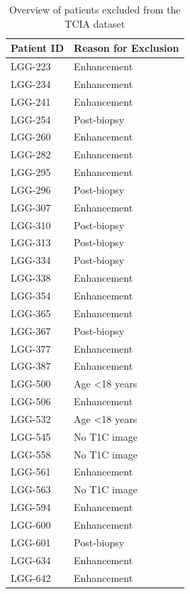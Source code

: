 \begin{subappendices}
\begin{table}[h]
    \centering
    \begin{tabular}{ll}
        \toprule
        \textbf{Patient ID} & \textbf{Reason for Exclusion} \\
        \midrule
        LGG-223 & Enhancement \\
        LGG-234 & Enhancement \\
        LGG-241 & Enhancement \\
        LGG-254 & Post-biopsy \\
        LGG-260 & Enhancement \\
        LGG-282 & Enhancement \\
        LGG-295 & Enhancement \\
        LGG-296 & Post-biopsy \\
        LGG-307 & Enhancement \\
        LGG-310 & Post-biopsy \\
        LGG-313 & Post-biopsy \\
        LGG-334 & Post-biopsy \\
        LGG-338 & Enhancement \\
        LGG-354 & Enhancement \\
        LGG-365 & Enhancement \\
        LGG-367 & Post-biopsy \\
        LGG-377 & Enhancement \\
        LGG-387 & Enhancement \\
        LGG-500 & Age \textless 18 years \\
        LGG-506 & Enhancement \\
        LGG-532 & Age \textless 18 years \\
        LGG-545 & No \gls{T1C} image \\
        LGG-558 & No \gls{T1C} image \\
        LGG-561 & Enhancement \\
        LGG-563 & No \gls{T1C} image \\
        LGG-594 & Enhancement \\
        LGG-600 & Enhancement \\
        LGG-601 & Post-biopsy \\
        LGG-634 & Enhancement \\
        LGG-642 & Enhancement\\
        \bottomrule
    \end{tabular}
    \caption{Overview of patients excluded from the TCIA dataset}
\end{table}


\end{subappendices}

